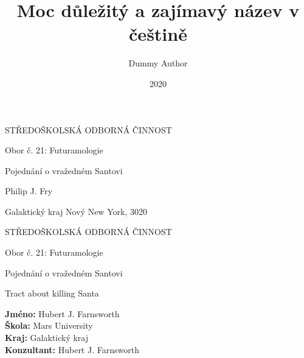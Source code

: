 \documentclass[12pt, a4paper,
 twoside,        %
 openright
]{report}
\title{Moc důležitý a zajímavý název v češtině} %
\author{Dummy Author} %
\date{2020} %
\begin{document}
\pagestyle{empty}

\begin{titlepage}
    \bfseries{ %
        \begin{center}
            \LARGE{STŘEDOŠKOLSKÁ ODBORNÁ ČINNOST}

            \vspace{14pt}
            \large{ %
                Obor č. 21: Futuramologie %
            } %

            \vspace{0.4 \textheight}

            \LARGE{ %
                Pojednání o vražedném Santovi
            }%

            \vspace{0.4\textheight}
        \end{center}
        
        \noindent\Large{Philip J. Fry}  %

        \noindent\Large{Galaktický kraj   Nový New York, 3020} %
        
            
    } %
\end{titlepage}

\cleardoublepage

{\bfseries %
    \begin{center}
        \LARGE{STŘEDOŠKOLSKÁ ODBORNÁ ČINNOST}

        \vspace{14pt}
        {\large %
            Obor č. 21: Futuramologie %
        } %

        \vspace{0.3 \textheight}

        \LARGE{ %
        Pojednání o vražedném Santovi
        }

        \LARGE{ %
        Tract about killing Santa
        }%

        \vspace{0.24\textheight}
    \end{center}  
}%
{\Large %
    \noindent\textbf{Jméno:} Hubert J. Farnsworth\\
    \textbf{Škola:} Mars University\\
    \textbf{Kraj:} Galaktický kraj\\
    \textbf{Konzultant:} Hubert J. Farnsworth\\
} %
\end{document}

